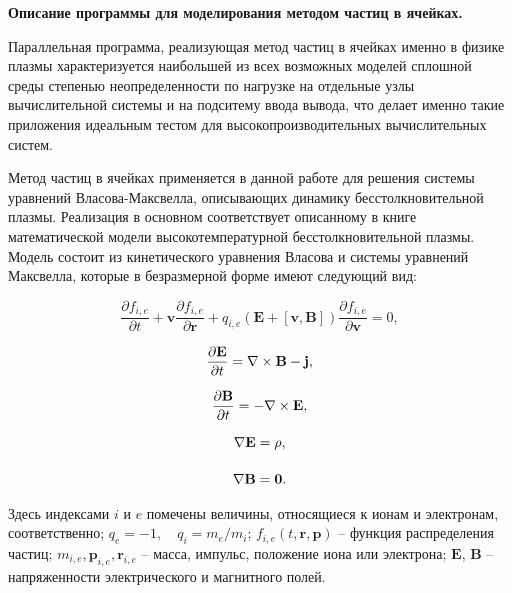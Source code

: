 \textbf{Описание программы для моделирования методом частиц в ячейках.}

Параллельная программа, реализующая  метод частиц в ячейках именно в физике плазмы характеризуется наибольшей из всех возможных моделей сплошной среды степенью неопределенности по нагрузке на отдельные узлы вычислительной системы и на подситему ввода вывода, что делает именно такие приложения идеальным тестом для высокопроизводительных вычислительных систем. 

Метод частиц в ячейках применяется в данной работе для решения системы уравнений Власова-Максвелла, описывающих динамику бесстолкновительной плазмы.
Реализация в основном соответствует описанному в книге \cite{VshivkovPICbook}
математической модели высокотемпературной бесстолкновительной плазмы.
Модель состоит из кинетического уравнения Власова и системы
уравнений Максвелла, которые в безразмерной форме имеют
следующий вид:

\begin{equation}\label{eq:Vlas}
\frac{\partial f_{i,e}}{\partial t}+{\textbf{v}} \frac{\partial f_{i,e}}{\partial \textbf{r}}+q_{i,e}({\textbf{E}}+[{\textbf{v}},{\textbf{B}}])\frac{\partial f_{i,e}}{\partial \textbf{v}}=0, 
\end{equation}

\begin{equation}
\begin{array}{c}\displaystyle

\frac{\partial \textbf{E}}{\partial t}=\nabla\times \textbf{B} - \bf{j},  \label{eq:dE}
\\[5mm]\displaystyle
\frac{\partial \textbf{B}}{\partial t}=-\nabla\times \textbf{E},  \label{eq:dB}
\\[5mm]\displaystyle
\nabla \bf{E} = \rho, \label{eq:divE}
\\[5mm]\displaystyle
\nabla \bf{B} = 0.  \label{eq:divB}

\end{array}
\end{equation}

Здесь индексами $i$ и $e$ помечены величины, относящиеся к ионам и
электронам, со\-от\-ветст\-вен\-но; $q_e=-1, \quad q_i=m_e/m_i$; $f_{i,e}(t,\textbf{r},\textbf{p})$ --
функция распределения частиц; $m_{i,e}, \textbf{p}_{i,e},
\textbf{r}_{i,e}$ -- масса, импульс, положение иона или электрона;
$\textbf{E}$, $\textbf{B}$ -- напряженности электрического и магнитного
полей. 


